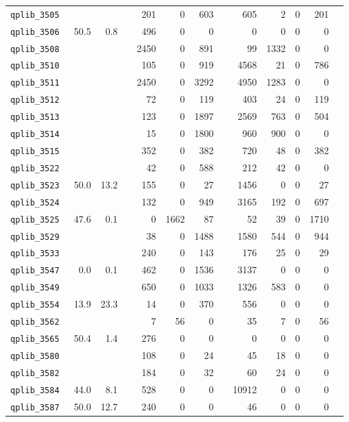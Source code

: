 {\begin{longtable}{lrrrrrrrrrrrr}
{\tt 	qplib\_3505	}	&		&		&	&	201	&	0	&	603	&	&	605	&	2	&	0	&	201	\\
{\tt 	qplib\_3506	}	&	50.5	&	0.8	&	&	496	&	0	&	0	&	&	0	&	0	&	0	&	0	\\
{\tt 	qplib\_3508	}	&		&		&	&	2450	&	0	&	891	&	&	99	&	1332	&	0	&	0	\\
{\tt 	qplib\_3510	}	&		&		&	&	105	&	0	&	919	&	&	4568	&	21	&	0	&	786	\\
{\tt 	qplib\_3511	}	&		&		&	&	2450	&	0	&	3292	&	&	4950	&	1283	&	0	&	0	\\
{\tt 	qplib\_3512	}	&		&		&	&	72	&	0	&	119	&	&	403	&	24	&	0	&	119	\\
{\tt 	qplib\_3513	}	&		&		&	&	123	&	0	&	1897	&	&	2569	&	763	&	0	&	504	\\
{\tt 	qplib\_3514	}	&		&		&	&	15	&	0	&	1800	&	&	960	&	900	&	0	&	0	\\
{\tt 	qplib\_3515	}	&		&		&	&	352	&	0	&	382	&	&	720	&	48	&	0	&	382	\\
{\tt 	qplib\_3522	}	&		&		&	&	42	&	0	&	588	&	&	212	&	42	&	0	&	0	\\
{\tt 	qplib\_3523	}	&	50.0	&	13.2	&	&	155	&	0	&	27	&	&	1456	&	0	&	0	&	27	\\
{\tt 	qplib\_3524	}	&		&		&	&	132	&	0	&	949	&	&	3165	&	192	&	0	&	697	\\
{\tt 	qplib\_3525	}	&	47.6	&	0.1	&	&	0	&	1662	&	87	&	&	52	&	39	&	0	&	1710	\\
{\tt 	qplib\_3529	}	&		&		&	&	38	&	0	&	1488	&	&	1580	&	544	&	0	&	944	\\
{\tt 	qplib\_3533	}	&		&		&	&	240	&	0	&	143	&	&	176	&	25	&	0	&	29	\\
{\tt 	qplib\_3547	}	&	0.0	&	0.1	&	&	462	&	0	&	1536	&	&	3137	&	0	&	0	&	0	\\
{\tt 	qplib\_3549	}	&		&		&	&	650	&	0	&	1033	&	&	1326	&	583	&	0	&	0	\\
{\tt 	qplib\_3554	}	&	13.9	&	23.3	&	&	14	&	0	&	370	&	&	556	&	0	&	0	&	0	\\
{\tt 	qplib\_3562	}	&		&		&	&	7	&	56	&	0	&	&	35	&	7	&	0	&	56	\\
{\tt 	qplib\_3565	}	&	50.4	&	1.4	&	&	276	&	0	&	0	&	&	0	&	0	&	0	&	0	\\
{\tt 	qplib\_3580	}	&		&		&	&	108	&	0	&	24	&	&	45	&	18	&	0	&	0	\\
{\tt 	qplib\_3582	}	&		&		&	&	184	&	0	&	32	&	&	60	&	24	&	0	&	0	\\
{\tt 	qplib\_3584	}	&	44.0	&	8.1	&	&	528	&	0	&	0	&	&	10912	&	0	&	0	&	0	\\
{\tt 	qplib\_3587	}	&	50.0	&	12.7	&	&	240	&	0	&	0	&	&	46	&	0	&	0	&	0	\\

\end{longtable}}
